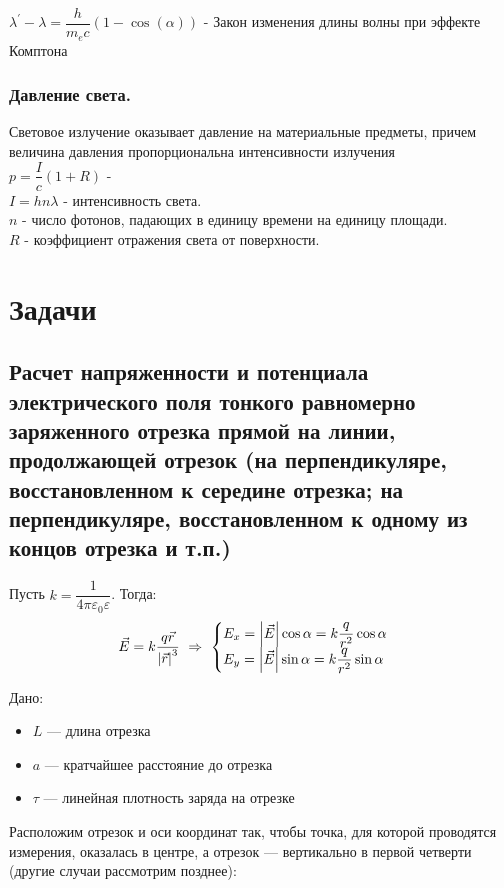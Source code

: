 \documentclass[12pt]{report}
\begin{document}
$\lambda^{'}-\lambda = \dfrac{h}{m_ec} (1-\cos(\alpha))$ - Закон изменения длины волны при эффекте
Комптона
\subsection{ Давление света.}
Световое излучение оказывает давление на
материальные предметы, причем величина давления
пропорциональна интенсивности излучения\\

$p=\dfrac{I}{c}(1+R)$ - \\

$I=hn\lambda$ - интенсивность света.\\

$n$ - число фотонов, падающих в единицу времени на единицу
площади.\\

$R$ - коэффициент отражения света от поверхности.

\chapter*{Задачи}
\setcounter{section}{0}

\section{Расчет напряженности и потенциала электрического поля тонкого равномерно заряженного отрезка прямой на линии, продолжающей отрезок (на перпендикуляре, восстановленном к середине отрезка; на перпендикуляре, восстановленном к одному из концов отрезка и т.п.)}
Пусть $k = \dfrac{1}{4\pi \varepsilon_0 \varepsilon}$. Тогда:
\[
    \vec{E} = k\dfrac{q\vec{r}}{\abs{\vec{r}}^3} \ \Rightarrow\ \begin{cases}
        E_x = \abs{\vec{E}} \cos{\alpha} = k\dfrac{q}{r^2} \cos{\alpha} \\
        E_y = \abs{\vec{E}} \sin{\alpha} = k\dfrac{q}{r^2} \sin{\alpha}
    \end{cases}
\]

Дано:
\begin{itemize}
    \item $L$ --- длина отрезка
    \item $a$ --- кратчайшее расстояние до отрезка
    \item $\tau$ --- линейная плотность заряда на отрезке
\end{itemize}

Расположим отрезок и оси координат так, чтобы точка, для которой проводятся измерения, оказалась в центре, а отрезок --- вертикально в первой четверти (другие случаи рассмотрим позднее):
\end{document}
